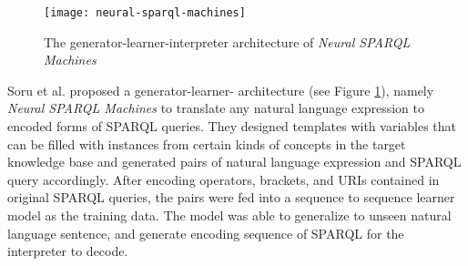 \begin{figure}[h]
\texttt{[image: neural-sparql-machines]}
\centering
\caption{The generator-learner-interpreter architecture of \textit{Neural SPARQL Machines} \cite{Soru2018a}}
\label{figure:nsm architecture}
\end{figure}

Soru et al. \cite{Soru2018a,Soru2018} proposed a generator-learner- architecture (see Figure \ref{figure:nsm architecture}), namely \textit{Neural SPARQL Machines} to translate any natural language expression to encoded forms of SPARQL queries. They designed templates with variables that can be filled with instances from certain kinds of concepts in the target knowledge base and generated pairs of natural language expression and SPARQL query accordingly. After encoding operators, brackets, and URIs contained in original SPARQL queries, the pairs were fed into a sequence to sequence learner model as the training data. The model was able to generalize to unseen natural language sentence, and generate encoding sequence of SPARQL for the interpreter to decode. 



